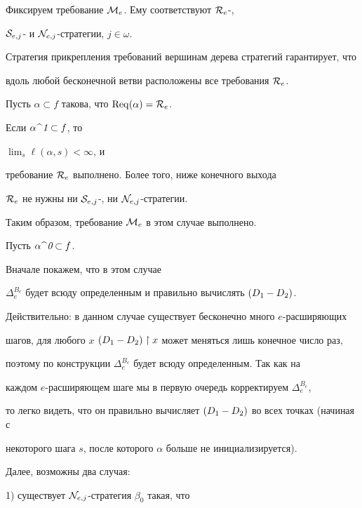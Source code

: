 \begin{pf}


Фиксируем требование ${\cal M}_e$. Ему соответствуют ${\cal R}_e$-,


${\cal S}_{e,j}$- и ${\cal N}_{e,j}$-стратегии, $j\in\omega$.


Стратегия прикрепления требований вершинам дерева стратегий гарантирует, что


вдоль любой бесконечной ветви расположены все требования ${\cal R}_e$.





Пусть $\alpha\subset f$ такова, что $\operatorname{Req}(\alpha)={\cal R}_e$.





Если $\alpha\,\widehat{\ }\,\text{\it 1}\subset f$, то


$\lim_s \ell(\alpha,s)<\infty$, и


требование ${\cal R}_e$ выполнено. Более того, ниже конечного выхода


${\cal R}_e$ не нужны ни ${\cal S}_{e,j}$-, ни ${\cal N}_{e,j}$-стратегии.


Таким образом, требование ${\cal M}_e$ в этом случае выполнено.





Пусть $\alpha\,\widehat{\ }\,\text{\it 0}\subset f$.


Вначале покажем, что в этом случае


$\Delta_e^{B_e}$ будет всюду определенным и правильно вычислять $\draz$.


Действительно: в данном случае существует бесконечно много $e$-расширяющих


шагов, для любого $x$ $\draz\rst x$ может меняться лишь конечное число раз,


поэтому по конструкции $\Delta_e^{B_e}$ будет всюду определенным. Так как на


каждом $e$-расширяющем шаге мы в первую очередь корректируем $\Delta_e^{B_e}$,


то легко видеть, что он правильно вычисляет $\draz$ во всех точках (начиная с


некоторого шага $s$, после которого $\alpha$ больше не инициализируется).





Далее, возможны два случая:


1) существует ${\cal N}_{e,j}$-стратегия $\beta_0$ такая, что



\end{pf}
